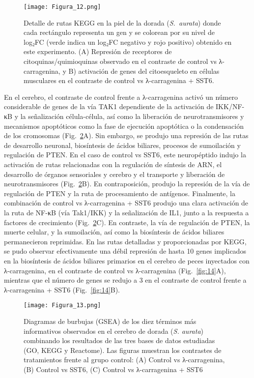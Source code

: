 \documentclass[10pt,a4paper]{article}
\begin{document}
\begin{figure}[htbp]
  \centering
 \texttt{[image: Figura\_12.png]}
 
  \caption{Detalle de rutas KEGG en la piel de la dorada (\textit{S.\ aurata}) donde cada rectángulo representa un gen y se colorean por su nivel de log₂FC (verde indica un log₂FC negativo y rojo positivo) obtenido en este experimento. (A) Represión de receptores de citoquinas/quimioquinas observado en el contraste de control vs λ-carragenina, y B) activación de genes del citoesqueleto en células musculares en el contraste de control vs λ-carragenina + SST6.}
  \label{fig:12}
\end{figure}

En el cerebro, el contraste de control frente a λ-carragenina activó un número considerable de genes de la vía TAK1 dependiente de la activación de IKK/NF-κB y la señalización célula-célula, así como la liberación de neurotransmisores y mecanismos apoptóticos como la fase de ejecución apoptótica o la condensación de los cromosomas (Fig.~\ref{fig:13}A). Sin embargo, se produjo una represión de las rutas de desarrollo neuronal, biosíntesis de ácidos biliares, procesos de sumoilación y regulación de PTEN. En el caso de control vs SST6, este neuropéptido indujo la activación de rutas relacionadas con la regulación de síntesis de ARN, el desarrollo de órganos sensoriales y cerebro y el transporte y liberación de neurotransmisores (Fig.~\ref{fig:13}B). En contraposición, produjo la represión de la vía de regulación de PTEN y la ruta de procesamiento de antígenos. Finalmente, la combinación de control vs λ-carragenina + SST6 produjo una clara activación de la ruta de NF-κB (vía Tak1/IKK) y la señalización de IL1, junto a la respuesta a factores de crecimiento (Fig.~\ref{fig:13}C). En contraste, la vía de regulación de PTEN, la muerte celular, y la sumoilación, así como la biosíntesis de ácidos biliares permanecieron reprimidas. En las rutas detalladas y proporcionadas por KEGG, se pudo observar efectivamente una débil represión de hasta 10 genes implicados en la biosíntesis de ácidos biliares primarios en el cerebro de peces inyectados con λ-carragenina, en el contraste de control vs λ-carragenina (Fig.~\ref{fig:14}A), mientras que el número de genes se redujo a 3 en el contraste de control frente a λ-carragenina + SST6 (Fig.~\ref{fig:14}B).

\begin{figure}[p]                 %
  \centering
  \texttt{[image: Figura\_13.png]}
  \caption{Diagramas de burbujas (GSEA) de los diez términos más informativos observados en el cerebro de dorada (\textit{S. aurata}) combinando los resultados de las tres bases de datos estudiadas (GO, KEGG y Reactome). Las figuras muestran los contrastes de tratamientos frente al grupo control: (A) Control vs λ-carragenina,  (B) Control vs SST6, (C) Control vs λ-carragenina + SST6}

  \label{fig:13}
\end{figure}
\clearpage                          %
\end{document}
